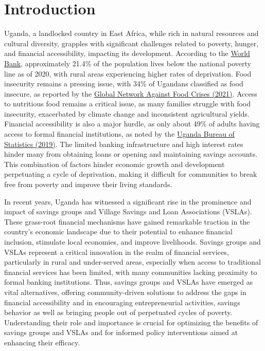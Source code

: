 \documentclass[12pt]{article}
\begin{document}
\section{Introduction}\label{sec:introduction}

\hspace{1cm} Uganda, a landlocked country in East Africa, while rich in natural resources and cultural diversity, grapples with significant challenges related to poverty, hunger, and financial accessibility, impacting its development. According to the \href{https://www.worldbank.org/en/topic/poverty/publication/poverty-and-equity-briefs}{World Bank}, approximately 21.4\% of the population lives below the national poverty line as of 2020, with rural areas experiencing higher rates of deprivation. Food insecurity remains a pressing issue, with 34\% of Ugandans classified as food insecure, as reported by the \href{https://www.wfp.org/publications/global-report-food-crises-grfc}{Global Network Against Food Crises (2021)}. Access to nutritious food remains a critical issue, as many families struggle with food insecurity, exacerbated by climate change and inconsistent agricultural yields. Financial accessibility is also a major hurdle, as only about 49\% of adults having access to formal financial institutions, as noted by the \href{https://www.ubos.org/wp-content/uploads/publications/09_2021Uganda-National-Survey-Report-2019-2020.pdf}{Uganda Bureau of Statistics (2019)}. The limited banking infrastructure and high interest rates hinder many from obtaining loans or opening and maintaining savings accounts. This combination of factors hinder economic growth and development perpetuating a cycle of deprivation, making it difficult for communities to break free from poverty and improve their living standards.

\hspace{1cm} In recent years, Uganda has witnessed a significant rise in the prominence and impact of savings groups and Village Savings and Loan Associations (VSLAs). These grass-root financial mechanisms have gained remarkable traction in the country's economic landscape due to their potential to enhance financial inclusion, stimulate local economies, and improve livelihoods. Savings groups and VSLAs represent a critical innovation in the realm of financial services, particularly in rural and under-served areas, especially when access to traditional financial services has been limited, with many communities lacking proximity to formal banking institutions. Thus, savings groups and VSLAs have emerged as vital alternatives, offering community-driven solutions to address the gaps in financial accessibility and in encouraging entrepreneurial activities, savings behavior as  well as bringing people out of perpetuated cycles of poverty. Understanding their role and importance is crucial for optimizing the benefits of savings groups and VSLAs and for informed policy interventions aimed at enhancing their efficacy. 
\end{document}
